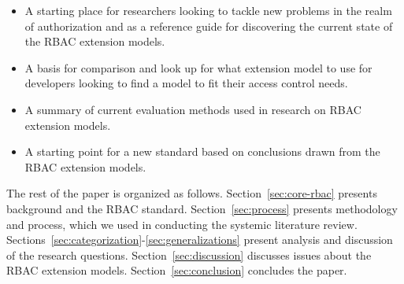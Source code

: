 \begin{itemize}
\setlength{\itemsep}{0.25pt}
\item A starting place for researchers looking to tackle new problems in the realm of authorization and as a reference guide for discovering
the current state of the RBAC extension models. 
\item A basis for comparison and look up for what extension model to use for developers looking to find a model to fit their access control needs.
\item A summary of current evaluation methods used in research on RBAC extension models.
\item A starting point for a new standard based on conclusions drawn from the RBAC extension models.
\end{itemize}

The rest of the paper is organized as follows. 
Section~\ref{sec:core-rbac} presents background and the RBAC standard. 
Section~\ref{sec:process} presents methodology and process, which we used in conducting the systemic literature review. 
Sections~\ref{sec:categorization}-\ref{sec:generalizations} present analysis and discussion of the research questions. 
Section~\ref{sec:discussion} discusses issues about the RBAC extension models.
Section~\ref{sec:conclusion} concludes the paper.
